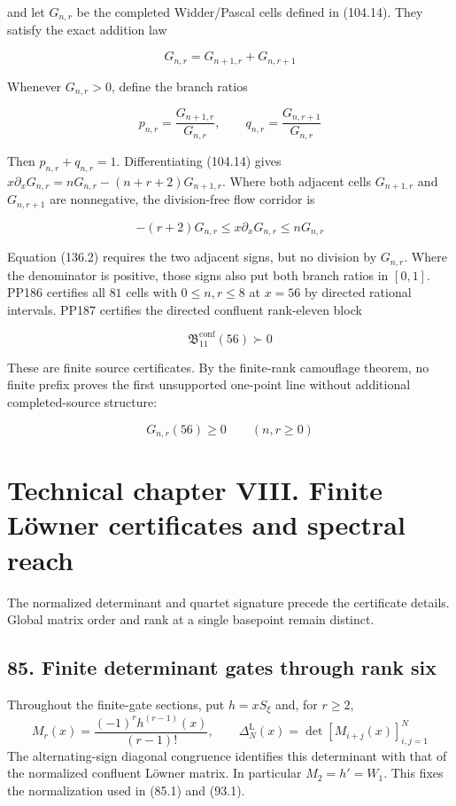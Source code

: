 \documentclass[
  11pt,
]{book}
\begin{document}
and let \(G_{n,r}\) be the completed Widder/Pascal cells defined in
(104.14). They satisfy the exact addition law

\[
\boxed{G_{n,r}=G_{n+1,r}+G_{n,r+1}}
\tag{136.1}
\]

Whenever \(G_{n,r}>0\), define the branch ratios

\[
p_{n,r}=\frac{G_{n+1,r}}{G_{n,r}},\qquad
q_{n,r}=\frac{G_{n,r+1}}{G_{n,r}}
\]

Then \(p_{n,r}+q_{n,r}=1\). Differentiating (104.14) gives
\(x\partial_xG_{n,r}=nG_{n,r}-(n+r+2)G_{n+1,r}\). Where both adjacent
cells \(G_{n+1,r}\) and \(G_{n,r+1}\) are nonnegative, the division-free
flow corridor is

\[
\boxed{
-(r+2)G_{n,r}
\le x\partial_xG_{n,r}
\le nG_{n,r}}
\tag{136.2}
\]

Equation (136.2) requires the two adjacent signs, but no division by
\(G_{n,r}\). Where the denominator is positive, those signs also put
both branch ratios in \([0,1]\). PP186 certifies all \(81\) cells with
\(0\le n,r\le8\) at \(x=56\) by directed rational intervals. PP187
certifies the directed confluent rank-eleven block

\[
\boxed{\mathfrak B_{11}^{\mathrm{conf}}(56)\succ0}
\tag{136.3}
\]

These are finite source certificates. By the finite-rank camouflage
theorem, no finite prefix proves the first unsupported one-point line
without additional completed-source structure:

\[
\boxed{G_{n,r}(56)\ge0\qquad(n,r\ge0)}
\tag{136.4}
\]


\chapter{Technical chapter VIII. Finite Löwner certificates and spectral
reach}\label{technical-chapter-viii.-finite-luxf6wner-certificates-and-spectral-reach}

The normalized determinant and quartet signature precede the certificate
details. Global matrix order and rank at a single basepoint remain
distinct.

\section{85. Finite determinant gates through rank
six}\label{finite-determinant-gates-through-rank-six}

Throughout the finite-gate sections, put \(h=xS_\xi\) and, for
\(r\ge2\), \[
M_r(x)=\frac{(-1)^r h^{(r-1)}(x)}{(r-1)!},\qquad
\Delta_N^{\mathrm L}(x)=\det[M_{i+j}(x)]_{i,j=1}^N
\] The alternating-sign diagonal congruence identifies this determinant
with that of the normalized confluent Löwner matrix. In particular
\(M_2=h'=W_1\). This fixes the normalization used in (85.1) and (93.1).
\end{document}

